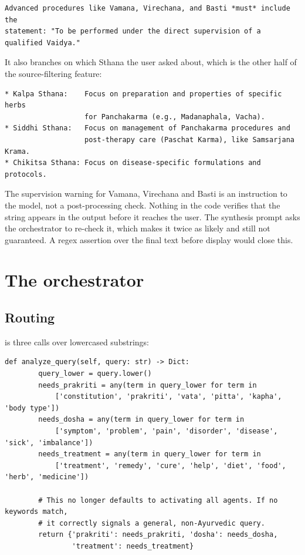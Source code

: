\begin{lstlisting}[style=plain]
Advanced procedures like Vamana, Virechana, and Basti *must* include the
statement: "To be performed under the direct supervision of a qualified Vaidya."
\end{lstlisting}

It also branches on which Sthana the user asked about, which is the other half of the source-filtering feature:

\begin{lstlisting}[style=plain]
* Kalpa Sthana:    Focus on preparation and properties of specific herbs
                   for Panchakarma (e.g., Madanaphala, Vacha).
* Siddhi Sthana:   Focus on management of Panchakarma procedures and
                   post-therapy care (Paschat Karma), like Samsarjana Krama.
* Chikitsa Sthana: Focus on disease-specific formulations and protocols.
\end{lstlisting}

\begin{warn}[title={Safety enforcement is prompt-level only}]
The supervision warning for Vamana, Virechana and Basti is an instruction to the model, not a post-processing check. Nothing in the code verifies that the string appears in the output before it reaches the user. The synthesis prompt asks the orchestrator to re-check it, which makes it twice as likely and still not guaranteed. A regex assertion over the final text before display would close this.
\end{warn}

\section{The orchestrator}

\subsection{Routing}

 is three  calls over lowercased substrings:

\begin{lstlisting}[style=py,firstnumber=27]
    def analyze_query(self, query: str) -> Dict:
        query_lower = query.lower()
        needs_prakriti = any(term in query_lower for term in
            ['constitution', 'prakriti', 'vata', 'pitta', 'kapha', 'body type'])
        needs_dosha = any(term in query_lower for term in
            ['symptom', 'problem', 'pain', 'disorder', 'disease', 'sick', 'imbalance'])
        needs_treatment = any(term in query_lower for term in
            ['treatment', 'remedy', 'cure', 'help', 'diet', 'food', 'herb', 'medicine'])

        # This no longer defaults to activating all agents. If no keywords match,
        # it correctly signals a general, non-Ayurvedic query.
        return {'prakriti': needs_prakriti, 'dosha': needs_dosha,
                'treatment': needs_treatment}
\end{lstlisting}

